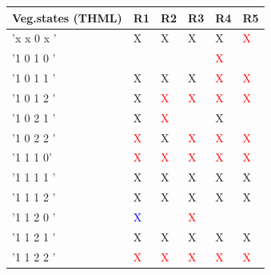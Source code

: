 \documentclass[preprint,3p,times,twocolumn]{elsarticle}
\begin{document}
\begin{table}[ht]
\begin{center}
\begin{tabular}{|p{}|p{}|p{}|p{}|p{}|p{}|}
\hline 
Veg.states (THML)                & R1 	            & R2                 & R3              & R4              & R5               \\ \hline
              	  'x x 0 x '     & X                     & X                     & X                  & X                  & \textcolor{red}{X}  \\
\rowcolor{yellow} '1 0 1 0 '     &                       &                       &                    & \textcolor{red}{X} &                     \\
              	  '1 0 1 1 '     & X                     & X                     & X                  & \textcolor{red}{X} & \textcolor{red}{X}  \\
              	  '1 0 1 2 '     & X                     & \textcolor{red}{X}    & \textcolor{red}{X} & \textcolor{red}{X} & \textcolor{red}{X}  \\
              	  '1 0 2 1 '     & X                     & \textcolor{red}{X}    &                    & X                  &                     \\
              	  '1 0 2 2 '     & \textcolor{red}{X}    & X                     & \textcolor{red}{X} & \textcolor{red}{X} & \textcolor{red}{X}  \\
\rowcolor{yellow} '1 1 1 0'      & \textcolor{red}{X}    & \textcolor{red}{X}    & \textcolor{red}{X} & \textcolor{red}{X} & \textcolor{red}{X}  \\
              	  '1 1 1 1 '     & X                     & X                     & X                  & X                  & X                   \\
              	  '1 1 1 2 '     & X                     & X                     & X                  & X                  & X                   \\
              	  '1 1 2 0 '     & \textcolor{blue}{X}   &                       & \textcolor{red}{X} &                    &                     \\
              	  '1 1 2 1 '     & X                     & X                     & X                  & X                  & X                   \\
              	  '1 1 2 2 '     & \textcolor{red}{X}    & \textcolor{red}{X}    & \textcolor{red}{X} & \textcolor{red}{X} & \textcolor{red}{X}  \\

\end{tabular}
\end{center}
\end{table}
\end{document}
